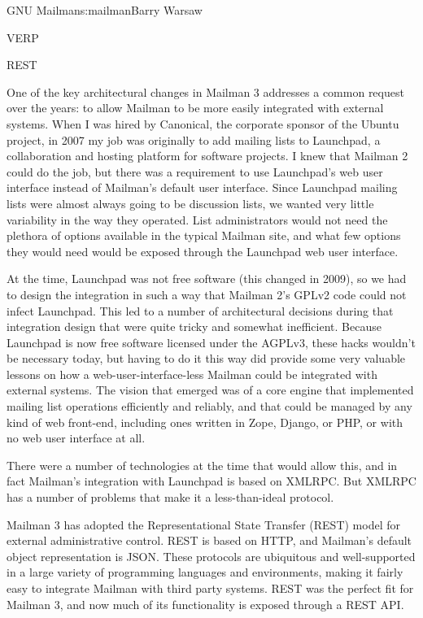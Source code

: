 \begin{aosachapter}{GNU Mailman}{s:mailman}{Barry Warsaw}
\begin{aosasect1}{VERP}
\end{aosasect1}

\begin{aosasect1}{REST}

One of the key architectural changes in Mailman 3 addresses a common
request over the years: to allow Mailman to be more easily integrated
with external systems.  When I was hired by Canonical, the corporate sponsor of the Ubuntu project, in 2007 my job
was originally to add mailing lists to Launchpad, a collaboration and
hosting platform for software projects.  I knew that Mailman
2 could do the job, but there was a requirement to use Launchpad's web
user interface instead of Mailman's default user interface.  Since
Launchpad mailing lists were almost always going to be discussion
lists, we wanted very little variability in the way they operated.
List administrators would not need the plethora of options available
in the typical Mailman site, and what few options they would need
would be exposed through the Launchpad web user interface.

At the time, Launchpad was not free software (this changed in 2009), so
we had to design the integration in such a way that Mailman 2's GPLv2
code could not infect Launchpad.  This led to a number of
architectural decisions during that integration design that were quite
tricky and somewhat inefficient.  Because Launchpad is now free
software licensed under the AGPLv3, these hacks wouldn't be necessary today, but having to do it
this way did provide some very valuable lessons on how a 
web-user-interface-less Mailman could be integrated with external systems.  The
vision that emerged was of a core engine that implemented mailing list
operations efficiently and reliably, and that could be managed by any
kind of web front-end, including ones written in Zope, Django, or PHP,
or with no web user interface at all.

There were a number of technologies at the time that would allow this,
and in fact Mailman's integration with Launchpad is based on XMLRPC.
But XMLRPC has a number of problems that make it a less-than-ideal
protocol.

Mailman 3 has adopted the Representational State
Transfer
(REST) model for external administrative control.  REST is based on
HTTP, and Mailman's default object representation is
JSON.  These
protocols are ubiquitous and well-supported in a large variety of
programming languages and environments, making it fairly easy to
integrate Mailman with third party systems.  REST was the perfect fit
for Mailman 3, and now much of its functionality is exposed through a
REST API.


\end{aosasect1}
\end{aosachapter}

